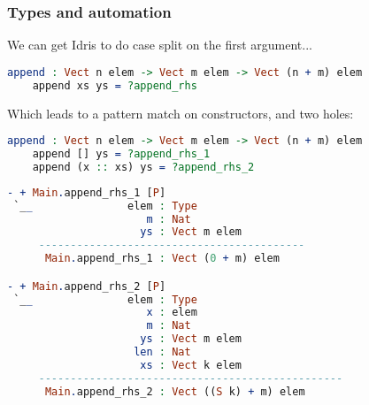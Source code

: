 \documentclass{beamer}
\begin{document}
\begin{frame}[fragile]
  \frametitle{Types and automation}

  We can get Idris to do case split on the first argument...

  \begin{lstlisting}[language=Idris]
    append : Vect n elem -> Vect m elem -> Vect (n + m) elem
    append xs ys = ?append_rhs      
  \end{lstlisting}

  \pause
  
  Which leads to a pattern match on constructors, and two holes:

  \begin{lstlisting}[language=Idris]
    append : Vect n elem -> Vect m elem -> Vect (n + m) elem
    append [] ys = ?append_rhs_1
    append (x :: xs) ys = ?append_rhs_2
  \end{lstlisting}

  \pause

  \begin{lstlisting}[language=Idris]
- + Main.append_rhs_1 [P]
 `__               elem : Type
                      m : Nat
                     ys : Vect m elem
     ------------------------------------------
      Main.append_rhs_1 : Vect (0 + m) elem

- + Main.append_rhs_2 [P]
 `__               elem : Type
                      x : elem
                      m : Nat
                     ys : Vect m elem
                    len : Nat
                     xs : Vect k elem
     ------------------------------------------------
      Main.append_rhs_2 : Vect ((S k) + m) elem
  \end{lstlisting}
\end{frame}
\end{document}
